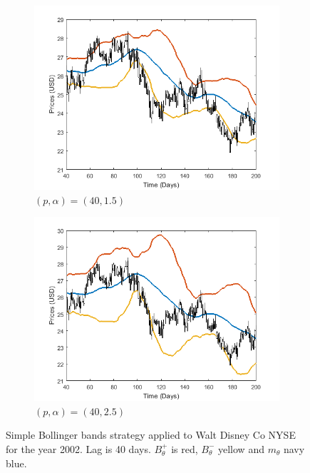 \documentclass[11pt,a4,twosided,singlespacing,titlepagenumber=on]{scrreprt}
\numberwithin{equation}{chapter} %
\theoremstyle{remark}
\begin{document}
\begin{figure}[H]
    \centering
    \begin{subfigure}[t]{0.49\textwidth}
        \centering
        \includegraphics[width=1\textwidth]{bollinger/3}
        \caption{$(p, \alpha) = (40,1.5)$}
        \label{bollinger3}
    \end{subfigure}
    \begin{subfigure}[t]{0.49\textwidth}
        \centering
        \includegraphics[width=1\textwidth]{bollinger/4}
        \caption{$(p, \alpha) = (40,2.5)$}
        \label{bollinger4}
    \end{subfigure}
    \caption{Simple Bollinger bands strategy applied to Walt Disney Co NYSE for the year 2002. Lag is 40 days. $B^+_\theta$ is red, $B^-_\theta$ yellow and $m_\theta$ navy blue.}
    \label{bollinger_bands_intro_2}
\end{figure}
\end{document}
